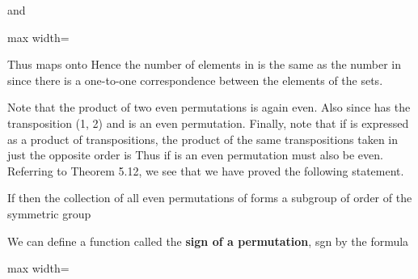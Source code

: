 \documentclass[11pt,oneside]{article}
\begin{document}
\begin{BookBody}

\noindent and

\begin{center}\begin{adjustbox}{max width=\linewidth}\end{adjustbox}\end{center}

\noindent Thus \BookInline{\lambda _{\tau }} maps onto  Hence the number of elements in  is the same as the number in  since there is a one-to-one correspondence between the elements of the sets.

Note that the product of two even permutations is again even. Also since  has the transposition (1, 2) and  is an even permutation. Finally, note that if \BookInline{\sigma } is expressed as a product of transpositions, the product of the same transpositions taken in just the opposite order is  Thus if \BookInline{\sigma } is an even permutation must also be even. Referring to Theorem 5.12, we see that we have proved the following statement.

 If  then the collection of all even permutations of  forms a subgroup of order  of the symmetric group 

We can define a function called the\textbf{ sign of a permutation}, sgn  by the formula

\begin{center}\begin{adjustbox}{max width=\linewidth}\end{adjustbox}\end{center}


\end{BookBody}
\end{document}
